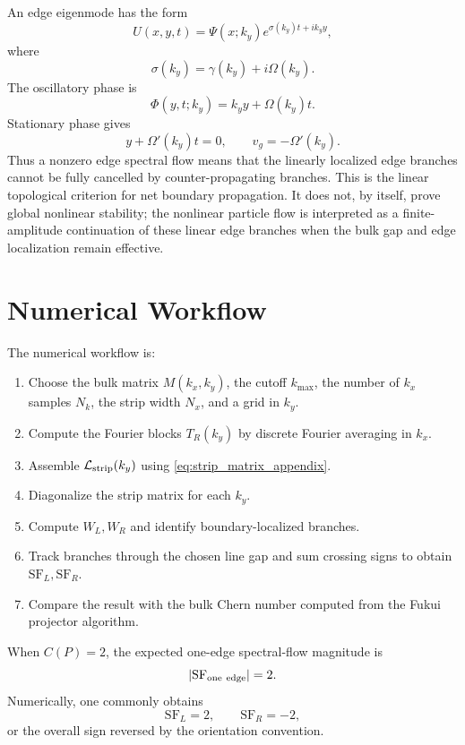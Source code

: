 \documentclass[11pt]{article}
\numberwithin{equation}{section}
\begin{document}
An edge eigenmode has the form
\begin{equation}
  U(x,y,t)=\Psi(x;k_y)e^{\sigma(k_y)t+ik_y y},
\end{equation}
where
\begin{equation}
  \sigma(k_y)=\gamma(k_y)+i\Omega(k_y).
\end{equation}
The oscillatory phase is
\begin{equation}
  \Phi(y,t;k_y)=k_y y+\Omega(k_y)t.
\end{equation}
Stationary phase gives
\begin{equation}
  y+\Omega'(k_y)t=0,
  \qquad
  v_g=-\Omega'(k_y).
\end{equation}
Thus a nonzero edge spectral flow means that the linearly localized edge
branches cannot be fully cancelled by counter-propagating branches. This
is the linear topological criterion for net boundary propagation. It does
not, by itself, prove global nonlinear stability; the nonlinear particle
flow is interpreted as a finite-amplitude continuation of these linear
edge branches when the bulk gap and edge localization remain effective.

\section{Numerical Workflow}

The numerical workflow is:
\begin{enumerate}[label=\arabic*.]
  \item Choose the bulk matrix $M(k_x,k_y)$, the cutoff $k_{\max}$, the number of
  $k_x$ samples $N_k$, the strip width $N_x$, and a grid in $k_y$.
  \item Compute the Fourier blocks $T_R(k_y)$ by discrete Fourier
  averaging in $k_x$.
  \item Assemble $\mathcal L_{\rm strip}(k_y)$ using
  \eqref{eq:strip_matrix_appendix}.
  \item Diagonalize the strip matrix for each $k_y$.
  \item Compute $W_L,W_R$ and identify boundary-localized branches.
  \item Track branches through the chosen line gap and sum crossing signs
  to obtain $\mathrm{SF}_L,\mathrm{SF}_R$.
  \item Compare the result with the bulk Chern number computed from the
  Fukui projector algorithm.
\end{enumerate}
When $C(P)=2$, the expected one-edge spectral-flow magnitude is
\begin{equation}
  |\mathrm{SF}_{\rm one\ edge}|=2.
\end{equation}
Numerically, one commonly obtains
\begin{equation}
  \mathrm{SF}_L=2,\qquad \mathrm{SF}_R=-2,
\end{equation}
or the overall sign reversed by the orientation convention.
\end{document}
